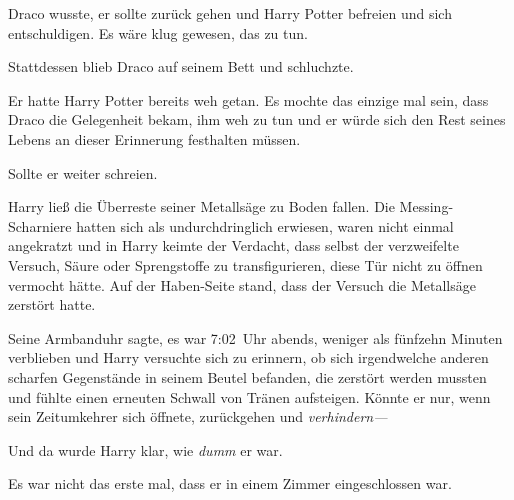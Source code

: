 Draco wusste, er sollte zurück gehen und Harry Potter befreien und sich entschuldigen. Es wäre klug gewesen, das zu tun.

Stattdessen blieb Draco auf seinem Bett und schluchzte.

Er hatte Harry Potter bereits weh getan. Es mochte das einzige mal sein, dass Draco die Gelegenheit bekam, ihm weh zu tun und er würde sich den Rest seines Lebens an dieser Erinnerung festhalten müssen.

Sollte er weiter schreien.

\later

Harry ließ die Überreste seiner Metallsäge zu Boden fallen. Die Messing-Scharniere hatten sich als undurchdringlich erwiesen, waren nicht einmal angekratzt und in Harry keimte der Verdacht, dass selbst der verzweifelte Versuch, Säure oder Sprengstoffe zu transfigurieren, diese Tür nicht zu öffnen vermocht hätte. Auf der Haben-Seite stand, dass der Versuch die Metallsäge zerstört hatte.

Seine Armbanduhr sagte, es war 7:02~Uhr abends, weniger als fünfzehn Minuten verblieben und Harry versuchte sich zu erinnern, ob sich irgendwelche anderen scharfen Gegenstände in seinem Beutel befanden, die zerstört werden mussten und fühlte einen erneuten Schwall von Tränen aufsteigen. Könnte er nur, wenn sein Zeitumkehrer sich öffnete, zurückgehen und \emph{verhindern—}

Und da wurde Harry klar, wie \emph{dumm} er war.

Es war nicht das erste mal, dass er in einem Zimmer eingeschlossen war.

